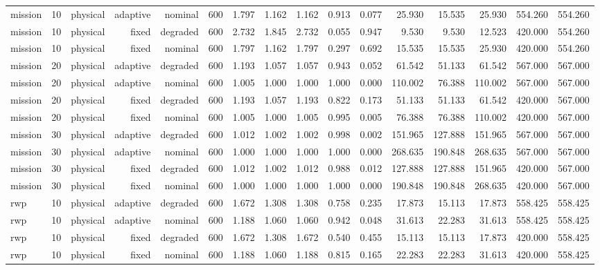 \begin{tabular}{lrrrrrrrrrrrrrrr}
mission & 10 & physical & adaptive & nominal & 600 & 1.797 & 1.162 & 1.162 & 0.913 & 0.077 & 25.930 & 15.535 & 25.930 & 554.260 & 554.260 \\
mission & 10 & physical & fixed & degraded & 600 & 2.732 & 1.845 & 2.732 & 0.055 & 0.947 & 9.530 & 9.530 & 12.523 & 420.000 & 554.260 \\
mission & 10 & physical & fixed & nominal & 600 & 1.797 & 1.162 & 1.797 & 0.297 & 0.692 & 15.535 & 15.535 & 25.930 & 420.000 & 554.260 \\
mission & 20 & physical & adaptive & degraded & 600 & 1.193 & 1.057 & 1.057 & 0.943 & 0.052 & 61.542 & 51.133 & 61.542 & 567.000 & 567.000 \\
mission & 20 & physical & adaptive & nominal & 600 & 1.005 & 1.000 & 1.000 & 1.000 & 0.000 & 110.002 & 76.388 & 110.002 & 567.000 & 567.000 \\
mission & 20 & physical & fixed & degraded & 600 & 1.193 & 1.057 & 1.193 & 0.822 & 0.173 & 51.133 & 51.133 & 61.542 & 420.000 & 567.000 \\
mission & 20 & physical & fixed & nominal & 600 & 1.005 & 1.000 & 1.005 & 0.995 & 0.005 & 76.388 & 76.388 & 110.002 & 420.000 & 567.000 \\
mission & 30 & physical & adaptive & degraded & 600 & 1.012 & 1.002 & 1.002 & 0.998 & 0.002 & 151.965 & 127.888 & 151.965 & 567.000 & 567.000 \\
mission & 30 & physical & adaptive & nominal & 600 & 1.000 & 1.000 & 1.000 & 1.000 & 0.000 & 268.635 & 190.848 & 268.635 & 567.000 & 567.000 \\
mission & 30 & physical & fixed & degraded & 600 & 1.012 & 1.002 & 1.012 & 0.988 & 0.012 & 127.888 & 127.888 & 151.965 & 420.000 & 567.000 \\
mission & 30 & physical & fixed & nominal & 600 & 1.000 & 1.000 & 1.000 & 1.000 & 0.000 & 190.848 & 190.848 & 268.635 & 420.000 & 567.000 \\
rwp & 10 & physical & adaptive & degraded & 600 & 1.672 & 1.308 & 1.308 & 0.758 & 0.235 & 17.873 & 15.113 & 17.873 & 558.425 & 558.425 \\
rwp & 10 & physical & adaptive & nominal & 600 & 1.188 & 1.060 & 1.060 & 0.942 & 0.048 & 31.613 & 22.283 & 31.613 & 558.425 & 558.425 \\
rwp & 10 & physical & fixed & degraded & 600 & 1.672 & 1.308 & 1.672 & 0.540 & 0.455 & 15.113 & 15.113 & 17.873 & 420.000 & 558.425 \\
rwp & 10 & physical & fixed & nominal & 600 & 1.188 & 1.060 & 1.188 & 0.815 & 0.165 & 22.283 & 22.283 & 31.613 & 420.000 & 558.425 \\

\end{tabular}
